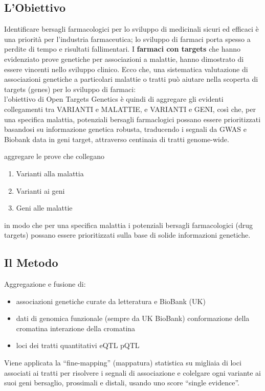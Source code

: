 \documentclass{article}
\begin{document}
\subsection{L'Obiettivo}
Identificare bersagli farmacologici per lo sviluppo di medicinali sicuri ed efficaci è una priorità per l'industria farmaceutica; lo sviluppo di farmaci porta spesso a perdite di tempo e risultati fallimentari.
I \textbf{farmaci con targets} che hanno evidenziato prove genetiche per associazioni a malattie, hanno dimostrato di essere vincenti nello sviluppo clinico. Ecco che, una sistematica valutazione di associazioni genetiche a particolari malattie o tratti può aiutare nella scoperta di targets (genes) per lo sviluppo di farmaci:\\
l'obiettivo di Open Targets Genetics è quindi di aggregare gli evidenti collegamenti tra VARIANTI e MALATTIE, e VARIANTI e GENI, così che, per una specifica malattia, potenziali bersagli farmaclogici possano essere prioritizzati basandosi su informazione genetica robusta, traducendo i segnali da GWAS e Biobank data in geni target, attraverso centinaia di tratti genome-wide.\\

\begin{box1}
    [title={\textbf{Obiettivo di Open Targets Genetics}}]
    {
    aggregare le prove che collegano 
    \begin{enumerate}
        \item Varianti alla malattia 
        \item Varianti ai geni
        \item Geni alle malattie 
    \end{enumerate}
    in modo che per una specifica malattia i potenziali bersagli farmacologici (drug targets) possano essere prioritizzati sulla base di solide informazioni genetiche. 
}
\end{box1}

\subsection{Il Metodo}
Aggregazione e fusione di:
\begin{itemize}
    \item associazioni genetiche curate da letteratura e BioBank (UK)
    \item dati di genomica funzionale (sempre da UK BioBank)
        \subitem conformazione della cromatina
        \subitem interazione della cromatina
    \item loci dei tratti quantitativi
        \subitem eQTL
        \subitem pQTL
\end{itemize}
Viene applicata la “fine-mapping” (mappatura) statistica su migliaia di loci associati ai tratti per risolvere i segnali di associazione e colelgare ogni variante ai suoi geni bersaglio, prossimali e distali, usando uno score “single evidence”.
\end{document}
